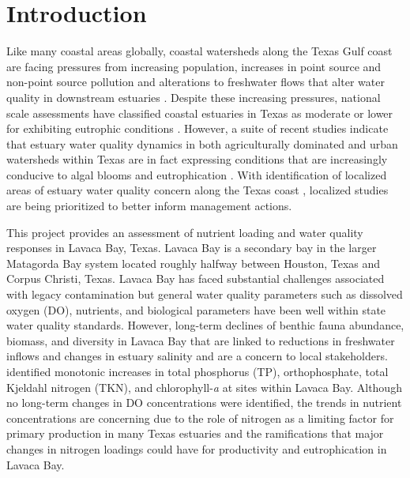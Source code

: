 \documentclass[water,article,submit,oneauthor]{Definitions/mdpi}
\begin{document}

\hypertarget{introduction}{%
\section{Introduction}\label{introduction}}

Like many coastal areas globally, coastal watersheds along the Texas
Gulf coast are facing pressures from increasing population, increases in
point source and non-point source pollution and alterations to
freshwater flows that alter water quality in downstream estuaries
\citep{bricker_effects_2008, kennicuttWaterQualityGulf2017, bugica_water_2020}.
Despite these increasing pressures, national scale assessments have
classified coastal estuaries in Texas as moderate or lower for
exhibiting eutrophic conditions \citep{bricker_effects_2008}. However, a
suite of recent studies indicate that estuary water quality dynamics in
both agriculturally dominated and urban watersheds within Texas are in
fact expressing conditions that are increasingly conducive to algal
blooms and eutrophication
\citep{wetzWaterQualityDynamics2016, wetz_exceptionally_2017, bugica_water_2020, chinPhytoplanktonBiomassCommunity2022}.
With identification of localized areas of estuary water quality concern
along the Texas coast \citep{bugica_water_2020}, localized studies are
being prioritized to better inform management actions.

This project provides an assessment of nutrient loading and water
quality responses in Lavaca Bay, Texas. Lavaca Bay is a secondary bay in
the larger Matagorda Bay system located roughly halfway between Houston,
Texas and Corpus Christi, Texas. Lavaca Bay has faced substantial
challenges associated with legacy contamination but general water
quality parameters such as dissolved oxygen (DO), nutrients, and
biological parameters have been well within state water quality
standards. However, long-term declines of benthic fauna abundance,
biomass, and diversity in Lavaca Bay that are linked to reductions in
freshwater inflows and changes in estuary salinity
\citep{beserespollackLongtermTrendsResponse2011, palmerImpactsDroughtsLow2015, montagnaAssessmentRelationshipFreshwater2020}
and are a concern to local stakeholders. \citet{bugica_water_2020}
identified monotonic increases in total phosphorus (TP), orthophosphate,
total Kjeldahl nitrogen (TKN), and chlorophyll-\emph{a} at sites within
Lavaca Bay. Although no long-term changes in DO concentrations were
identified, the trends in nutrient concentrations are concerning due to
the role of nitrogen as a limiting factor for primary production in many
Texas estuaries
\citep{gardnerNitrogenFixationDissimilatory2006, houTransformationFateNitrate2012, doradoUnderstandingInteractionsFreshwater2015, paudelRelationshipSuspendedSolids2019, wetz_exceptionally_2017}
and the ramifications that major changes in nitrogen loadings could have
for productivity and eutrophication in Lavaca Bay.
\end{document}
